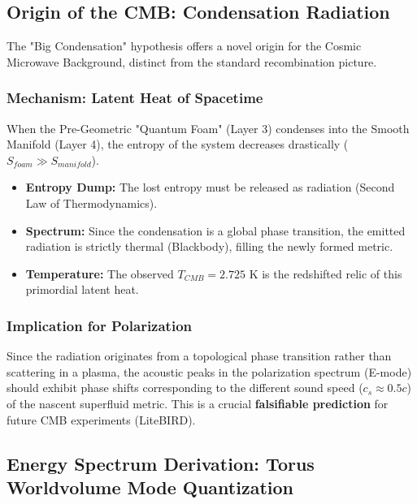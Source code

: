 \documentclass[a4paper,12pt]{article}
\begin{document}
\subsection{Origin of the CMB: Condensation Radiation}

The "Big Condensation" hypothesis offers a novel origin for the Cosmic Microwave Background, distinct from the standard recombination picture.

\subsubsection{Mechanism: Latent Heat of Spacetime}
When the Pre-Geometric "Quantum Foam" (Layer 3) condenses into the Smooth Manifold (Layer 4), the entropy of the system decreases drastically ($S_{foam} \gg S_{manifold}$).
\begin{itemize}
    \item \textbf{Entropy Dump:} The lost entropy must be released as radiation (Second Law of Thermodynamics).
    \item \textbf{Spectrum:} Since the condensation is a global phase transition, the emitted radiation is strictly thermal (Blackbody), filling the newly formed metric.
    \item \textbf{Temperature:} The observed $T_{CMB} = 2.725$ K is the redshifted relic of this primordial latent heat.
\end{itemize}

\subsubsection{Implication for Polarization}
Since the radiation originates from a topological phase transition rather than scattering in a plasma, the acoustic peaks in the polarization spectrum (E-mode) should exhibit phase shifts corresponding to the different sound speed ($c_s \approx 0.5c$) of the nascent superfluid metric. This is a crucial \textbf{falsifiable prediction} for future CMB experiments (LiteBIRD).

\subsection{Energy Spectrum Derivation: Torus Worldvolume Mode Quantization}\label{sec:spectrum-old}
\end{document}
